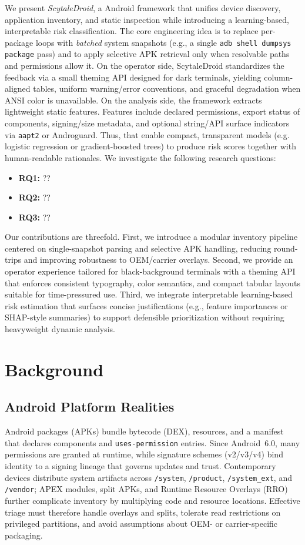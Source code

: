 \documentclass[10pt,conference]{IEEEtran}
\begin{document}
We present \emph{ScytaleDroid}, a Android framework that unifies device discovery, application inventory, and static inspection while introducing a learning-based, interpretable risk classification. The core engineering idea is to replace per-package loops with \emph{batched} system snapshots (e.g., a single \texttt{adb shell dumpsys package} pass) and to apply selective APK retrieval only when resolvable paths and permissions allow it. On the operator side, ScytaleDroid standardizes the feedback via a small theming API designed for dark terminals, yielding column-aligned tables, uniform warning/error conventions, and graceful degradation when ANSI color is unavailable. On the analysis side, the framework extracts lightweight static features. Features include declared permissions, export status of components, signing/size metadata, and optional string/API surface indicators via \texttt{aapt2} or Androguard. Thus, that enable compact, transparent models (e.g. logistic regression or gradient-boosted trees) to produce risk scores together with human-readable rationales. We investigate the following research questions:
\begin{itemize}
  \item \textbf{RQ1:} ??
  \item \textbf{RQ2:} ??
  \item \textbf{RQ3:} ??
\end{itemize}

Our contributions are threefold. First, we introduce a modular inventory pipeline centered on single-snapshot parsing and selective APK handling, reducing round-trips and improving robustness to OEM/carrier overlays. Second, we provide an operator experience tailored for black-background terminals with a theming API that enforces consistent typography, color semantics, and compact tabular layouts suitable for time-pressured use. Third, we integrate interpretable learning-based risk estimation that surfaces concise justifications (e.g., feature importances or SHAP-style summaries) to support defensible prioritization without requiring heavyweight dynamic analysis.

\section{Background}\label{sec:background}
\subsection{Android Platform Realities}
Android packages (APKs) bundle bytecode (DEX), resources, and a manifest that declares components and \texttt{uses\mbox{-}permission} entries. Since Android~6.0, many permissions are granted at runtime, while signature schemes (v2/v3/v4) bind identity to a signing lineage that governs updates and trust. Contemporary devices distribute system artifacts across \texttt{/system}, \texttt{/product}, \texttt{/system\_ext}, and \texttt{/vendor}; APEX modules, split APKs, and Runtime Resource Overlays (RRO) further complicate inventory by multiplying code and resource locations. Effective triage must therefore handle overlays and splits, tolerate read restrictions on privileged partitions, and avoid assumptions about OEM- or carrier-specific packaging.
\end{document}
